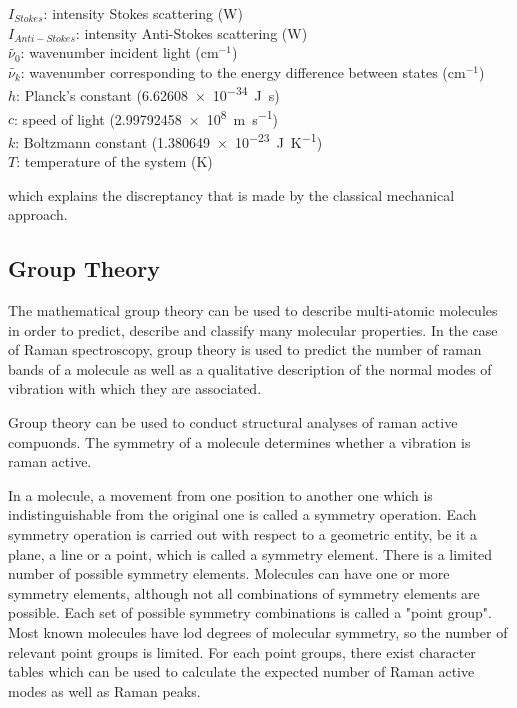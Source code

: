  \(I_{Stokes}\): intensity Stokes scattering (\unit{\watt})\\
 \(I_{Anti-Stokes}\): intensity Anti-Stokes scattering (\unit{\watt})\\
\(\widetilde{\nu_0}\): wavenumber incident light (cm\(^{-1}\))\\
\(\widetilde{\nu_k}\): wavenumber corresponding to the energy difference between states (cm\(^{-1}\))\\
\( h\): Planck's constant (\SI{6.62608e-34}{\joule\second})\\
\(c\): speed of light (\SI{2.99792458e8}{\meter\per\second})\\
\(k\): Boltzmann constant (\SI{1.380649e-23}{\joule\per\kelvin})\\
\(T\): temperature of the system (\unit{\kelvin})

\bigskip


which explains the discreptancy that is made by the classical mechanical approach. \cite{theory1} \cite{presentation}

\newpage

\subsection{Group Theory}
The mathematical group theory can be used to describe multi-atomic molecules in order to predict, describe and classify many molecular properties. In the case of Raman spectroscopy, group theory is used to predict the number of raman bands of a molecule as well as a qualitative description of the normal modes of vibration with which they are associated.

\bigskip

Group theory can be used to conduct structural analyses of raman active compuonds. The symmetry of a molecule determines whether a vibration is raman active. 

\bigskip

In a molecule, a movement from one position to another one which is indistinguishable from the original one is called a symmetry operation. Each symmetry operation is carried out with respect to a geometric entity, be it a plane, a line or a point, which is called a symmetry element. There is a limited number of possible symmetry elements. Molecules can have one or more symmetry elements, although not all combinations of symmetry elements are possible. Each set of possible symmetry combinations is called a "point group". Most known molecules have lod degrees of molecular symmetry, so the number of relevant point groups is limited. For each point groups, there exist character tables which can be used to calculate the expected number of Raman active modes as well as Raman peaks. \cite{gt}